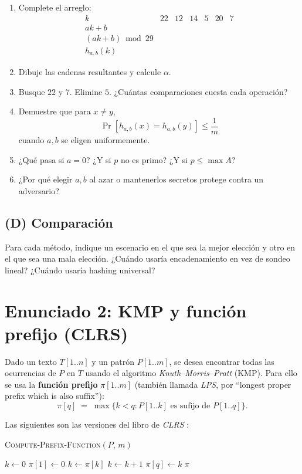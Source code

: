 \documentclass[11pt]{article}
\begin{document}
\begin{enumerate}[label=(\alph*),itemsep=0.25em]
\item Complete el arreglo:
\[
\begin{array}{c|cccccc}
k & 22 & 12 & 14 & 5 & 20 & 7\\ \hline
ak+b & & & & & & \\
(ak+b)\bmod 29 & & & & & & \\
h_{a,b}(k) & & & & & &
\end{array}
\]
\item Dibuje las cadenas resultantes y calcule \(\alpha\).
\item Busque \(22\) y \(7\). Elimine \(5\). ¿Cuántas comparaciones cuesta cada operación?
\item Demuestre que para \(x\neq y\),
\[
\Pr[h_{a,b}(x)=h_{a,b}(y)]\le \frac1m
\]
cuando \(a,b\) se eligen uniformemente.
\item ¿Qué pasa si \(a=0\)? ¿Y si \(p\) no es primo? ¿Y si \(p\le\max A\)?
\item ¿Por qué elegir \(a,b\) al azar o mantenerlos secretos protege contra un adversario?
\end{enumerate}

\subsection*{(D) Comparación}

Para cada método, indique un escenario en el que sea la mejor elección y otro en el que sea una mala elección. ¿Cuándo usaría encadenamiento en vez de sondeo lineal? ¿Cuándo usaría hashing universal?

\clearpage

\section*{Enunciado 2: KMP y función prefijo (CLRS)}

Dado un texto \(T[1..n]\) y un patrón \(P[1..m]\), se desea encontrar todas las ocurrencias de \(P\) en \(T\) usando el algoritmo \emph{Knuth--Morris--Pratt} (KMP). Para ello se usa la \textbf{función prefijo} \(\pi[1..m]\) (también llamada \emph{LPS}, por ``longest proper prefix which is also suffix''):
\[
\pi[q] \;=\; \max\{k < q : P[1..k] \text{ es sufijo de } P[1..q]\}.
\]

Las siguientes son las versiones del libro de \emph{CLRS }:

\noindent\textsc{Compute-Prefix-Function}$(P,\,m)$
\begin{algorithmic}[1]
\State $k \gets 0$
\State $\pi[1] \gets 0$
    \State $k \gets \pi[k]$
  \EndWhile
    \State $k \gets k + 1$
  \EndIf
  \State $\pi[q] \gets k$
\EndFor
\State \Return $\pi$
\end{algorithmic}
\end{document}
